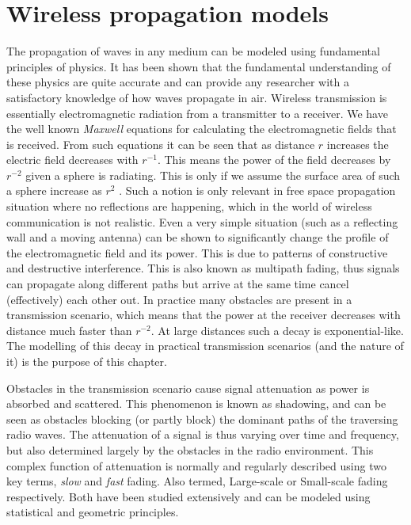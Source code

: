 \chapter{Wireless propagation models}\label{ch:channelmodellingbasics}

The propagation of waves in any medium can be modeled using fundamental principles of physics. It has been shown that the fundamental understanding of these physics are quite accurate and can provide any researcher with a satisfactory knowledge of how waves propagate in air. Wireless transmission is essentially electromagnetic radiation from a transmitter to a receiver. We have the well known \emph{Maxwell} equations for calculating the electromagnetic fields that is received. From such equations it can be seen that as distance $r$ increases the electric field decreases with $r^{-1}$. This means the power of the field decreases by $r^{-2}$ given a sphere is radiating. This is only if we assume the surface area of such a sphere increase as $r^2$ \cite{Tse2005FundamentalsCommunication}. Such a notion is only relevant in free space propagation situation where no reflections are happening, which in the world of wireless communication is not realistic. Even a very simple situation (such as a reflecting wall and a moving antenna) can be shown to significantly change the profile of the electromagnetic field and its power. This is due to patterns of constructive and destructive interference. This is also known as multipath fading, thus signals can propagate along different paths but arrive at the same time cancel (effectively) each other out. In practice many obstacles are present in a transmission scenario, which means that the power at the receiver decreases with distance much faster than $r^{-2}$. At large distances such a decay is exponential-like. The modelling of this decay in practical transmission scenarios (and the nature of it) is the purpose of this chapter.

Obstacles in the transmission scenario cause signal attenuation as power is absorbed and scattered. This phenomenon is known as shadowing, and can be seen as obstacles blocking (or partly block) the dominant paths of the traversing radio waves. The attenuation of a signal is thus varying over time and frequency, but also determined largely by the obstacles in the radio environment. This complex function of attenuation is normally and regularly described using two key terms, \emph{slow} and \emph{fast} fading. Also termed, Large-scale or Small-scale fading respectively. Both have been studied extensively and can be modeled using statistical and geometric principles.


